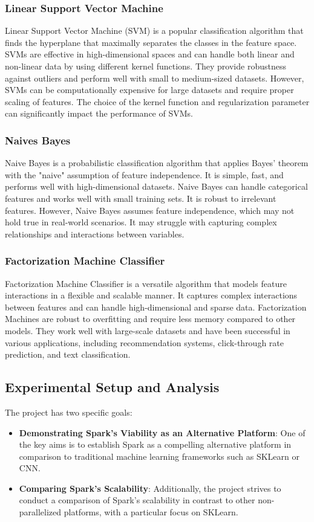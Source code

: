 \documentclass[12pt]{report}
\begin{document}
\subsubsection{Linear Support Vector Machine}
Linear Support Vector Machine (SVM) is a popular classification algorithm that finds the hyperplane that maximally separates the classes in the feature space. SVMs are effective in high-dimensional spaces and can handle both linear and non-linear data by using different kernel functions. They provide robustness against outliers and perform well with small to medium-sized datasets. However, SVMs can be computationally expensive for large datasets and require proper scaling of features. The choice of the kernel function and regularization parameter can significantly impact the performance of SVMs.

\subsubsection{Naives Bayes}
Naive Bayes is a probabilistic classification algorithm that applies Bayes' theorem with the "naive" assumption of feature independence. It is simple, fast, and performs well with high-dimensional datasets. Naive Bayes can handle categorical features and works well with small training sets. It is robust to irrelevant features. However, Naive Bayes assumes feature independence, which may not hold true in real-world scenarios. It may struggle with capturing complex relationships and interactions between variables.

\subsubsection{Factorization Machine Classifier}
Factorization Machine Classifier is a versatile algorithm that models feature interactions in a flexible and scalable manner. It captures complex interactions between features and can handle high-dimensional and sparse data. Factorization Machines are robust to overfitting and require less memory compared to other models. They work well with large-scale datasets and have been successful in various applications, including recommendation systems, click-through rate prediction, and text classification.
\subsection{Experimental Setup and Analysis}
The project has two specific goals: 
\begin{itemize}
    \item \textbf{Demonstrating Spark's Viability as an Alternative Platform}: One of the key aims is to establish Spark as a compelling alternative platform in comparison to traditional machine learning frameworks such as SKLearn or CNN.
    \item \textbf{Comparing Spark's Scalability}: Additionally, the project strives to conduct a  comparison of Spark's scalability in contrast to other non-parallelized platforms, with a particular focus on SKLearn.
\end{itemize}
\end{document}
